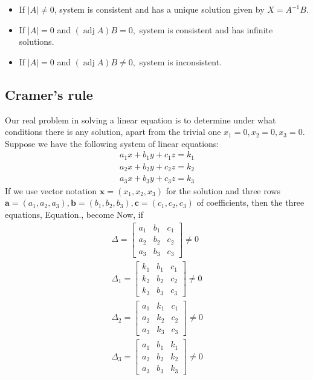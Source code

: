 \begin{itemize}
	\item  If $|A| \neq 0$, system is consistent and has a unique solution given by $X=A^{-1} B$.
	\item If $|A|=0$ and $(\operatorname{adj} A) B=0,$ system is consistent and has infinite solutions.
	\item If $|A|=0$ and $(\operatorname{adj} A) B \neq 0,$ system is inconsistent.
	
\end{itemize}
\subsection{Cramer's rule}
Our real problem in solving a linear equation is to determine under what conditions there is any solution, apart from the trivial one $x_{1}=0, x_{2}=0, x_{3}=0$. 
Suppose we have the following system of linear equations:
\begin{equation}
\begin{array}{l}
a_{1} x+b_{1} y+c_{1} z=k_{1} \\
a_{2} x+b_{2} y+c_{2} z=k_{2} \\
a_{3} x+b_{3} y+c_{3} z=k_{3}
\end{array}\label{Matrices linear 001}
\end{equation}
If we use vector notation $\mathbf{x}=\left(x_{1}, x_{2}, x_{3}\right)$ for the solution and three rows $\mathbf{a}=\left(a_{1}, a_{2}, a_{3}\right), \mathbf{b}=\left(b_{1}, b_{2}, b_{3}\right), \mathbf{c}=\left(c_{1}, c_{2}, c_{3}\right)$ of coefficients, then the three equations, Equation.\label{Matrices linear 001}, become
Now, if
$$
\begin{array}{l}
	\Delta=\left[\begin{array}{lll}
		a_{1} & b_{1} & c_{1} \\
		a_{2} & b_{2} & c_{2} \\
		a_{3} & b_{3} & c_{3}
	\end{array}\right] \neq 0 \\
	\Delta_{1}=\left[\begin{array}{lll}
		k_{1} & b_{1} & c_{1} \\
		k_{2} & b_{2} & c_{2} \\
		k_{3} & b_{3} & c_{3}
	\end{array}\right] \neq 0 \\
	\Delta_{2}=\left[\begin{array}{lll}
		a_{1} & k_{1} & c_{1} \\
		a_{2} & k_{2} & c_{2} \\
		a_{3} & k_{3} & c_{3}
	\end{array}\right] \neq 0 \\
	\Delta_{3}=\left[\begin{array}{lll}
		a_{1} & b_{1} & k_{1} \\
		a_{2} & b_{2} & k_{2} \\
		a_{3} & b_{3} & k_{3}
	\end{array}\right] \neq 0
\end{array}
$$
